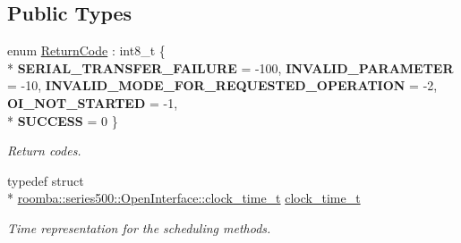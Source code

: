 \subsection*{Public Types}
\begin{DoxyCompactItemize}
\item 
\hypertarget{classroomba_1_1series500_1_1_open_interface_a43fc2ae1216e57cfb46901331b9ab4c7}{enum \hyperlink{classroomba_1_1series500_1_1_open_interface_a43fc2ae1216e57cfb46901331b9ab4c7}{Return\+Code} \+: int8\+\_\+t \{ \\*
{\bfseries S\+E\+R\+I\+A\+L\+\_\+\+T\+R\+A\+N\+S\+F\+E\+R\+\_\+\+F\+A\+I\+L\+U\+R\+E} = -\/100, 
{\bfseries I\+N\+V\+A\+L\+I\+D\+\_\+\+P\+A\+R\+A\+M\+E\+T\+E\+R} = -\/10, 
{\bfseries I\+N\+V\+A\+L\+I\+D\+\_\+\+M\+O\+D\+E\+\_\+\+F\+O\+R\+\_\+\+R\+E\+Q\+U\+E\+S\+T\+E\+D\+\_\+\+O\+P\+E\+R\+A\+T\+I\+O\+N} = -\/2, 
{\bfseries O\+I\+\_\+\+N\+O\+T\+\_\+\+S\+T\+A\+R\+T\+E\+D} = -\/1, 
\\*
{\bfseries S\+U\+C\+C\+E\+S\+S} = 0
 \}}\label{classroomba_1_1series500_1_1_open_interface_a43fc2ae1216e57cfb46901331b9ab4c7}

\begin{DoxyCompactList}\small\item\em Return codes. \end{DoxyCompactList}\item 
typedef struct \\*
\hyperlink{structroomba_1_1series500_1_1_open_interface_1_1clock__time__t}{roomba\+::series500\+::\+Open\+Interface\+::clock\+\_\+time\+\_\+t} \hyperlink{classroomba_1_1series500_1_1_open_interface_a28e1b87b0cce69349c416a7fcda3d624}{clock\+\_\+time\+\_\+t}
\begin{DoxyCompactList}\small\item\em Time representation for the scheduling methods. \end{DoxyCompactList}\end{DoxyCompactItemize}
